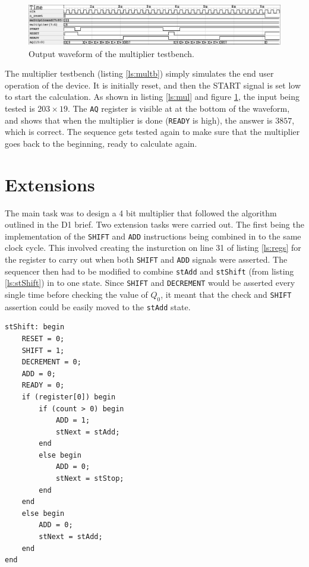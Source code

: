 \documentclass[a4paper,11pt]{article}
\begin{document}
\begin{figure}[H]
    \centering
        \includegraphics[scale=0.65]{../out/multiplier_tb.eps}
    \caption{Output waveform of the multiplier testbench.}
    \label{fig:multbw}
\end{figure}

The multiplier testbench (listing \ref{ls:multb}) simply simulates the end user operation of the device. It is initially reset, and then the START signal is set low to start the calculation. As shown in listing \ref{ls:mul} and figure \ref{fig:multbw}, the input being tested is $203\times19$. The \lstinline{AQ} register is visible at at the bottom of the waveform, and shows that when the multiplier is done (\lstinline{READY} is high), the answer is $3857$, which is correct. The sequence gets tested again to make sure that the multiplier goes back to the beginning, ready to calculate again.

\section{Extensions}

The main task was to design a 4 bit multiplier that followed the algorithm outlined in the D1 brief. Two extension tasks were carried out. The first being the implementation of the \lstinline{SHIFT} and \lstinline{ADD} instructions being combined in to the same clock cycle. This involved creating the insturction on line 31 of listing \ref{ls:regs} for the register to carry out when both \lstinline{SHIFT} and \lstinline{ADD} signals were asserted. The sequencer then had to be modified to combine \lstinline{stAdd} and \lstinline{stShift} (from listing \ref{ls:stShift}) in to one state. Since \lstinline{SHIFT} and \lstinline{DECREMENT} would be asserted every single time before checking the value of $Q_0$, it meant that the check and \lstinline{SHIFT} assertion could be easily moved to the \lstinline{stAdd} state.

\begin{lstlisting}
stShift: begin
    RESET = 0;
    SHIFT = 1;
    DECREMENT = 0;
    ADD = 0;
    READY = 0;
    if (register[0]) begin
        if (count > 0) begin
            ADD = 1;
            stNext = stAdd;
        end
        else begin
            ADD = 0;
            stNext = stStop;
        end
    end
    else begin
        ADD = 0;
        stNext = stAdd;
    end
end
\end{lstlisting}
\end{document}
